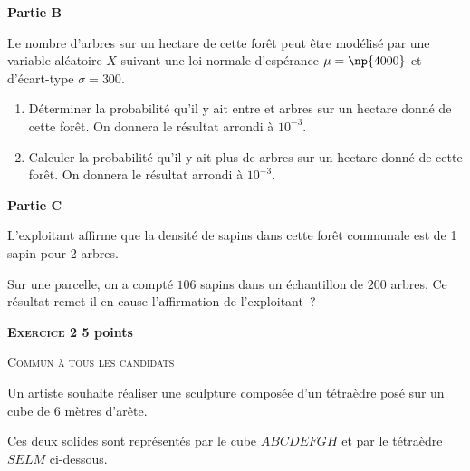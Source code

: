 \documentclass[10pt,a4paper]{article}
\begin{document}
\medskip

\textbf{Partie B}

\smallskip

Le nombre d'arbres sur un hectare de cette forêt peut être modélisé par une variable aléatoire $X$ suivant une loi normale d'espérance $\mu=\np{4000}$ et d'écart-type $\sigma=300$.

\medskip

\begin{enumerate}
\item Déterminer la probabilité qu'il y ait entre  et  arbres sur un hectare donné de cette forêt. On donnera le résultat arrondi à $10^{-3}$.
\item Calculer la probabilité qu'il y ait plus de  arbres sur un hectare donné de cette forêt.
On donnera le résultat arrondi à $10^{-3}$.
\end{enumerate}

\medskip

\textbf{Partie C}

\smallskip

L'exploitant affirme que la densité de sapins dans cette forêt communale est de 1 sapin pour 2 arbres.

\smallskip

Sur une parcelle, on a compté $106$ sapins dans un échantillon de $200$ arbres.
Ce résultat remet-il en cause l'affirmation de l'exploitant~?

\vspace{1cm}\textbf{\textsc{Exercice 2} \hfill 5 points}

\smallskip
\textsc{Commun à tous les candidats}

\bigskip

Un artiste souhaite réaliser une sculpture composée d'un tétraèdre posé sur un cube de 6 mètres d'arête.

Ces deux solides sont représentés par le cube $ABCDEFGH$ et par le tétraèdre $SELM$ ci-dessous.
\end{document}
